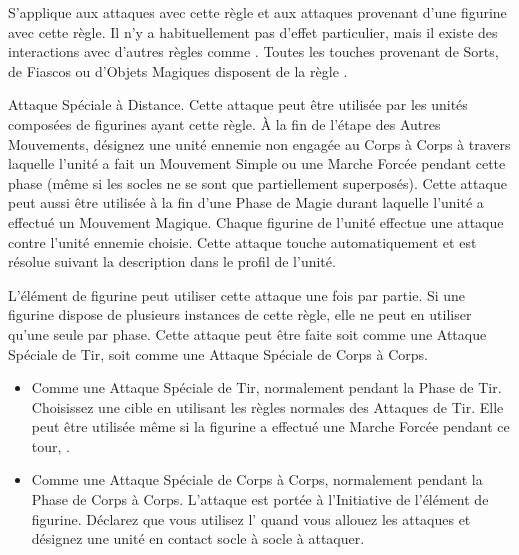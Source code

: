 S'applique aux attaques avec cette règle et aux attaques provenant d'une figurine avec cette règle. Il n'y a habituellement pas d'effet particulier, mais il existe des interactions avec d'autres règles comme \ethereal{}.  Toutes les touches provenant de Sorts, de Fiascos ou d'Objets Magiques disposent de la règle \magicalattacks{}.


Attaque Spéciale à Distance. Cette attaque peut être utilisée par les unités composées de figurines ayant cette règle. À la fin de l'étape des Autres Mouvements, désignez une unité ennemie non engagée au Corps à Corps à travers laquelle l'unité a fait un Mouvement Simple ou une Marche Forcée pendant cette phase (même si les socles ne se sont que partiellement superposés). Cette attaque peut aussi être utilisée à la fin d'une Phase de Magie durant laquelle l'unité a effectué un Mouvement Magique. Chaque figurine de l'unité effectue une attaque contre l'unité ennemie choisie. Cette attaque touche automatiquement et est résolue suivant la description dans le profil de l'unité.


L'élément de figurine peut utiliser cette attaque une fois par partie. Si une figurine dispose de plusieurs instances de cette règle, elle ne peut en utiliser qu'une seule par phase. Cette attaque peut être faite soit comme une Attaque Spéciale de Tir, soit comme une Attaque Spéciale de Corps à Corps.
\begin{itemize}[label={\textbullet}]
\item Comme une Attaque Spéciale de Tir, normalement pendant la Phase de Tir. Choisissez une cible en utilisant les règles normales des Attaques de Tir.  Elle peut être utilisée même si la figurine a effectué une Marche Forcée pendant ce tour, .
\item Comme une Attaque Spéciale de Corps à Corps, normalement pendant la Phase de Corps à Corps. L'attaque est portée à l'Initiative de l'élément de figurine. Déclarez que vous utilisez l'\breathweapon{} quand vous allouez les attaques et désignez une unité en contact socle à socle à attaquer.
\end{itemize}

